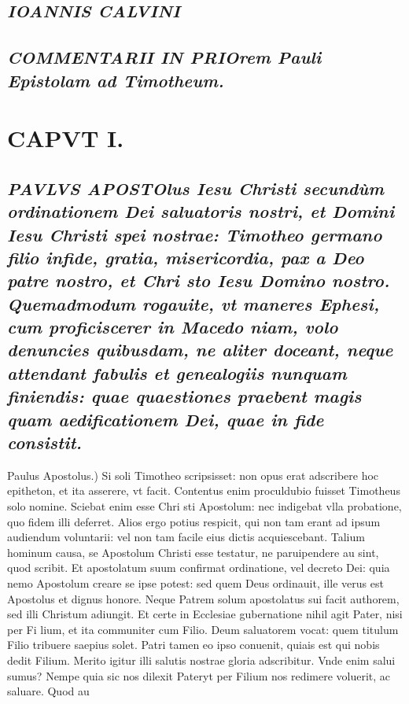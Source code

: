 \documentclass{article}
\begin{document}
\begin{pages}
\subsection*{\textit{IOANNIS CALVINI }}
{}
\subsection*{\textit{COMMENTARII IN PRIOrem Pauli Epistolam ad Timotheum. }}
\section{CAPVT I.}
{}
\subsection*{\textit{\huge\textbf{P}\normalsize AVLVS APOSTOlus Iesu Christi secundùm ordinationem Dei saluatoris nostri, et Domini Iesu Christi spei nostrae: Timotheo germano filio infide, gratia, misericordia, pax a Deo patre nostro, et Chri sto Iesu Domino nostro. Quemadmodum rogauite, vt maneres Ephesi, cum proficiscerer in Macedo niam, volo denuncies quibusdam, ne aliter doceant, neque attendant fabulis et genealogiis nunquam finiendis: quae quaestiones praebent magis quam aedificationem Dei, quae in fide consistit. }}\pstart Paulus Apostolus.) Si soli Timotheo scripsisset: non opus erat adscribere hoc epitheton, et ita asserere, vt facit. Contentus enim proculdubio fuisset Timotheus solo nomine. Sciebat enim esse Chri sti Apostolum: nec indigebat vlla probatione, quo fidem illi deferret. Alios ergo potius respicit, qui non tam erant ad ipsum audiendum voluntarii: vel non tam facile eius dictis acquiescebant. Talium hominum causa, se Apostolum Christi esse testatur, ne paruipendere au sint, quod scribit. Et apostolatum suum confirmat ordinatione, vel decreto Dei: quia nemo Apostolum creare se ipse potest: sed quem Deus ordinauit, ille verus est Apostolus et dignus honore. Neque Patrem solum apostolatus sui facit authorem, sed illi Christum adiungit. Et certe in Ecclesiae gubernatione nihil agit Pater, nisi per Fi lium, et ita communiter cum Filio. Deum saluatorem vocat: quem titulum Filio tribuere saepius solet. Patri tamen eo ipso conuenit, quiais est qui nobis dedit Filium. Merito igitur illi salutis nostrae gloria adscribitur. Vnde enim salui sumus? Nempe quia sic nos dilexit Pateryt per Filium nos redimere voluerit, ac saluare. Quod au\pend

\end{pages}
\end{document}
